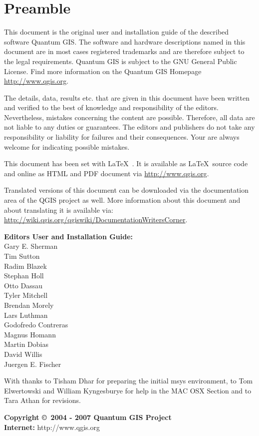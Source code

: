 \thispagestyle{empty}
\section*{Preamble}

\vspace{1cm}

This document is the original user and installation guide of the described 
software Quantum GIS. The software and hardware descriptions named in this 
document are in most cases registered trademarks and are therefore subject 
to the legal requirements. Quantum GIS is subject to the GNU General Public 
License. Find more information on the Quantum GIS Homepage \url{http://www.qgis.org}.

The details, data, results etc. that are given in this document have been 
written and verified to the best of knowledge and responsibility of the 
editors. Nevertheless, mistakes concerning the content are possible. 
Therefore, all data are not liable to any duties or guarantees. The editors 
and publishers do not take any responsibility or liability for failures and 
their consequences. Your are always welcome for indicating possible mistakes.

This document has been set with \LaTeX~. It is available as \LaTeX~source 
code and online as HTML and PDF document via \url{http://www.qgis.org}.

Translated versions of this document can be downloaded via the documentation 
area of the QGIS project as well. More information about this document and 
about translating it is available via: \\
\url{http://wiki.qgis.org/qgiswiki/DocumentationWritersCorner}. 

\begin{flushleft}
\textbf{Editors User and Installation Guide:} 
\\ Gary E. Sherman 
\\ Tim Sutton 
\\ Radim Blazek 
\\ Stephan Holl 
\\ Otto Dassau 
\\ Tyler Mitchell 
\\ Brendan Morely 
\\ Lars Luthman 
\\ Godofredo Contreras 
\\ Magnus Homann
\\ Martin Dobias
\\ David Willis
\\ Juergen E. Fischer

With thanks to Tisham Dhar for preparing the initial msys environment, to Tom 
Elwertowski and William Kyngesburye for help in the MAC OSX Section and to Tara 
Athan for revisions.

\textbf{Copyright \copyright~2004 - 2007 Quantum GIS Project} \\
\textbf{Internet:} http://www.qgis.org
\end{flushleft}

